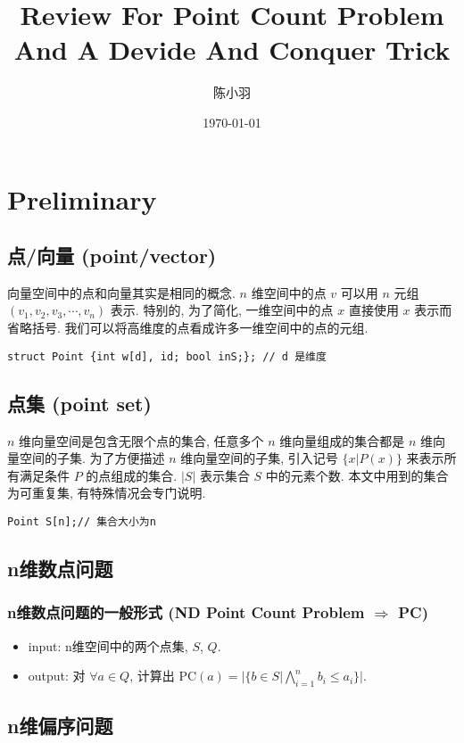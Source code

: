\documentclass[11pt]{article}
\author{陈小羽}
\date{\today}
\title{Review For Point Count Problem And A Devide And Conquer Trick}
\begin{document}
\maketitle
\tableofcontents


\section{Preliminary}
\label{sec:orgc80a432}
\subsection{点/向量 (point/vector)}
\label{sec:orgda28584}
向量空间中的点和向量其实是相同的概念.
\(n\) 维空间中的点 \(v\) 可以用 \(n\) 元组 \((v_1, v_2, v_3, \cdots, v_n)\) 表示.
特别的, 为了简化, 一维空间中的点 \(x\) 直接使用 \(x\) 表示而省略括号.
我们可以将高维度的点看成许多一维空间中的点的元组.
\begin{verbatim}
struct Point {int w[d], id; bool inS;}; // d 是维度
\end{verbatim}
\subsection{点集 (point set)}
\label{sec:org227f77e}
\(n\) 维向量空间是包含无限个点的集合, 任意多个 \(n\) 维向量组成的集合都是 \(n\) 维向量空间的子集.
为了方便描述 \(n\) 维向量空间的子集, 引入记号 \(\{ x | P(x)\}\) 来表示所有满足条件 \(P\) 的点组成的集合.
\(|S|\) 表示集合 \(S\) 中的元素个数. 本文中用到的集合为可重复集, 有特殊情况会专门说明.
\begin{verbatim}
Point S[n];// 集合大小为n
\end{verbatim}
\subsection{n维数点问题}
\label{sec:org2f95c83}
\subsubsection{n维数点问题的一般形式 (ND Point Count Problem \(\Rightarrow\) PC)}
\label{sec:orgac4f870}
\begin{itemize}
\item input: n维空间中的两个点集, \(S\), \(Q\).
\item output: 对 \(\forall a \in Q\), 计算出 \(\mbox{PC}(a) = |\{ b\in S| \bigwedge_{i=1}^n b_i\leq a_i\}|\).
\end{itemize}
\subsection{n维偏序问题}
\label{sec:org4b40a8f}
\end{document}
